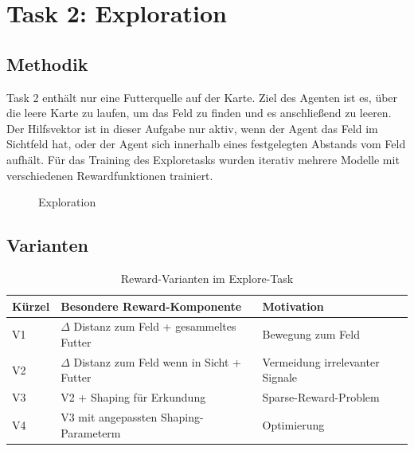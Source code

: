 \section{Task 2: Exploration}
\label{sec:explore}
\subsection{Methodik}
Task 2 enthält nur eine Futterquelle auf der Karte. Ziel des Agenten ist es, über die leere Karte zu laufen, um das Feld zu finden und es anschließend zu leeren. Der Hilfsvektor ist in dieser Aufgabe nur aktiv, wenn der Agent das Feld im Sichtfeld hat, oder der Agent sich innerhalb eines festgelegten Abstands vom Feld aufhält. Für das Training des Exploretasks wurden iterativ mehrere Modelle mit verschiedenen Rewardfunktionen trainiert.
\begin{figure}[htbp]
  \centering
  \caption{Exploration}
  \label{fig:explore_scenario}
\end{figure}

\subsection{Varianten}
\begin{table}[h]
  \centering
  \caption{Reward-Varianten im Explore-Task}
  \begin{tabular}{@{}lll@{}}
    \toprule
    Kürzel & Besondere Reward-Komponente & Motivation \\ \midrule
    V1 & $\Delta$ Distanz zum Feld + gesammeltes Futter & Bewegung zum Feld  \\
    V2 & $\Delta$ Distanz zum Feld wenn in Sicht + Futter & Vermeidung irrelevanter Signale\\
    V3 & V2 + Shaping für Erkundung      & Sparse-Reward-Problem  \\ 
    V4 & V3 mit angepassten Shaping-Parameterm & Optimierung
    \\ \bottomrule
  \end{tabular}
\end{table}


